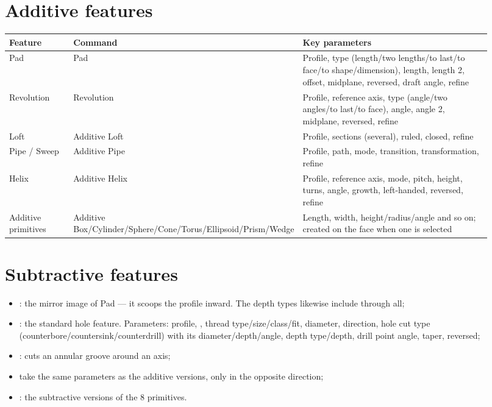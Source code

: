 \section{Additive features}

\small
\begin{longtable}{@{}p{0.17\linewidth}p{0.10\linewidth}p{0.65\linewidth}@{}}
\toprule \textbf{Feature} & \textbf{Command} & \textbf{Key parameters} \\ \midrule \endhead
Pad & Pad & Profile, type (length/two lengths/to last/to face/to shape/dimension), length, length 2, offset, midplane, reversed, draft angle, refine \\
Revolution & Revolution & Profile, reference axis, type (angle/two angles/to last/to face), angle, angle 2, midplane, reversed, refine \\
Loft & Additive Loft & Profile, sections (several), ruled, closed, refine \\
Pipe / Sweep & Additive Pipe & Profile, path, mode, transition, transformation, refine \\
Helix & Additive Helix & Profile, reference axis, mode, pitch, height, turns, angle, growth, left-handed, reversed, refine \\
Additive primitives & Additive Box/Cylinder/Sphere/Cone/Torus/Ellipsoid/Prism/Wedge & Length, width, height/radius/angle and so on; created on the face when one is selected \\
\bottomrule
\end{longtable}

\section{Subtractive features}

\begin{itemize}
  \item {}: the mirror image of Pad --- it scoops the profile inward. The depth types likewise include through all;
  \item {}: the standard hole feature. Parameters: profile, , thread type/size/class/fit, diameter,
        direction, hole cut type (counterbore/countersink/counterdrill) with its diameter/depth/angle, depth type/depth,
        drill point angle, taper, reversed;
  \item {}: cuts an annular groove around an axis;
  \item {} take the same parameters as the additive versions, only in the opposite direction;
  \item {}: the subtractive versions of the 8 primitives.
\end{itemize}

